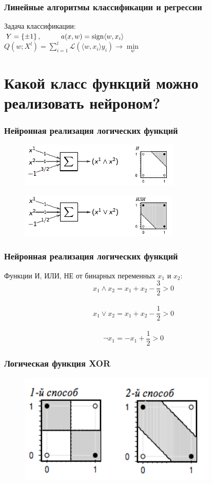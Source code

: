 \documentclass[10pt]{beamer}
\begin{document}
\begin{frame}\frametitle{Линейные алгоритмы классификации и регрессии}
	Задача классификации: \\
	$Y = \left\{ \pm1 \right\}, \hspace{10mm} a(x,w) = \sign \langle w, x_i \rangle $\\
	$Q(w;X^l) = \sum\limits_{i=1}^l \mathcal{L} (\langle w, x_i\rangle y_i) \rightarrow \min\limits_w$\\
\end{frame}

\section{Какой класс функций можно реализовать нейроном?}

\begin{frame}\frametitle{Нейронная реализация логических функций}
	\begin{figure}[htbp]
	  \includegraphics[height=60pt, keepaspectratio = true]{images/OR}   
	\end{figure}
	
	\begin{figure}[htbp]
	  \includegraphics[height=60pt, keepaspectratio = true]{images/AND}   
	\end{figure}
\end{frame}

\begin{frame}\frametitle{Нейронная реализация логических функций}
	Функции И, ИЛИ, НЕ от бинарных переменных $x_1$ и $x_2$:\\
	$$x_1 \wedge x_2 = x_1 + x_2 - \frac{3}{2} > 0$$\\
	$$x_1 \vee x_2 = x_1 + x_2 - \frac{1}{2} > 0$$\\
	$$\neg x_1 = -x_1 + \frac{1}{2}> 0$$
\end{frame}

\begin{frame}\frametitle{Логическая функция XOR}
	\begin{figure}[htbp]
	  \includegraphics[height=150pt, keepaspectratio = true]{images/XOR}   
	\end{figure}
\end{frame}
\end{document}
